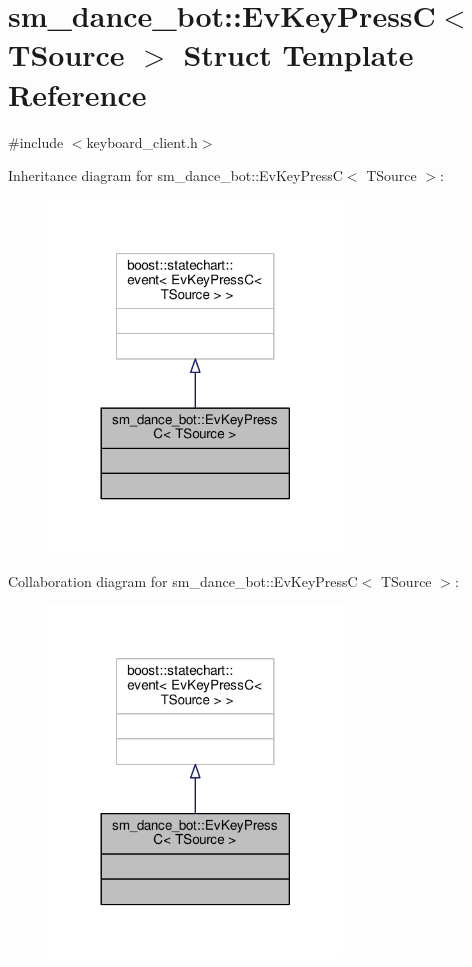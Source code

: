 \hypertarget{structsm__dance__bot_1_1EvKeyPressC}{}\section{sm\+\_\+dance\+\_\+bot\+:\+:Ev\+Key\+PressC$<$ T\+Source $>$ Struct Template Reference}
\label{structsm__dance__bot_1_1EvKeyPressC}


{\ttfamily \#include $<$keyboard\+\_\+client.\+h$>$}



Inheritance diagram for sm\+\_\+dance\+\_\+bot\+:\+:Ev\+Key\+PressC$<$ T\+Source $>$\+:
\nopagebreak
\begin{figure}[H]
\begin{center}
\leavevmode
\includegraphics[width=221pt]{structsm__dance__bot_1_1EvKeyPressC__inherit__graph}
\end{center}
\end{figure}


Collaboration diagram for sm\+\_\+dance\+\_\+bot\+:\+:Ev\+Key\+PressC$<$ T\+Source $>$\+:
\nopagebreak
\begin{figure}[H]
\begin{center}
\leavevmode
\includegraphics[width=221pt]{structsm__dance__bot_1_1EvKeyPressC__coll__graph}
\end{center}
\end{figure}


